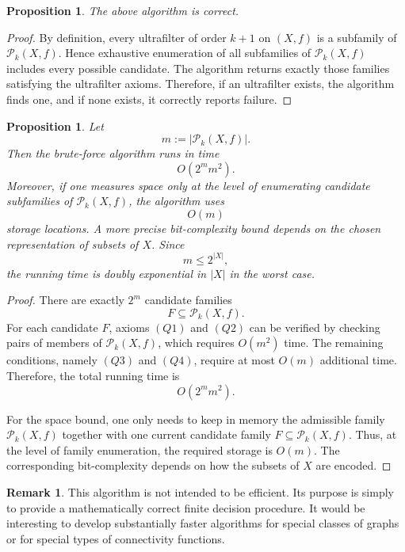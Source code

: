 \documentclass[10pt]{book}
\newtheorem{proposition}[theorem]{Proposition}
\theoremstyle{definition}
\newtheorem{remark}[theorem]{Remark}
\begin{document}
\begin{proposition}
The above algorithm is correct.
\end{proposition}

\begin{proof}
By definition, every ultrafilter of order \(k+1\) on \((X,f)\) is a subfamily of \(\mathcal{P}_k(X,f)\).
Hence exhaustive enumeration of all subfamilies of \(\mathcal{P}_k(X,f)\) includes every possible candidate.
The algorithm returns exactly those families satisfying the ultrafilter axioms.
Therefore, if an ultrafilter exists, the algorithm finds one, and if none exists, it correctly reports failure.
\end{proof}

\begin{proposition}
Let
\[
m:=\bigl|\mathcal{P}_k(X,f)\bigr|.
\]
Then the brute-force algorithm runs in time
\[
O(2^m m^2).
\]
Moreover, if one measures space only at the level of enumerating candidate subfamilies of \(\mathcal{P}_k(X,f)\), the algorithm uses
\[
O(m)
\]
storage locations.
A more precise bit-complexity bound depends on the chosen representation of subsets of \(X\).
Since
\[
m\le 2^{|X|},
\]
the running time is doubly exponential in \(|X|\) in the worst case.
\end{proposition}

\begin{proof}
There are exactly \(2^m\) candidate families
\[
F\subseteq \mathcal{P}_k(X,f).
\]
For each candidate \(F\), axioms \((Q1)\) and \((Q2)\) can be verified by checking pairs of members of \(\mathcal{P}_k(X,f)\), which requires \(O(m^2)\) time.
The remaining conditions, namely \((Q3)\) and \((Q4)\), require at most \(O(m)\) additional time.
Therefore, the total running time is
\[
O(2^m m^2).
\]

For the space bound, one only needs to keep in memory the admissible family \(\mathcal{P}_k(X,f)\) together with one current candidate family \(F\subseteq \mathcal{P}_k(X,f)\).
Thus, at the level of family enumeration, the required storage is \(O(m)\).
The corresponding bit-complexity depends on how the subsets of \(X\) are encoded.
\end{proof}

\begin{remark}
This algorithm is not intended to be efficient.
Its purpose is simply to provide a mathematically correct finite decision procedure.
It would be interesting to develop substantially faster algorithms for special classes of graphs or for special types of connectivity functions.
\end{remark}
\end{document}
